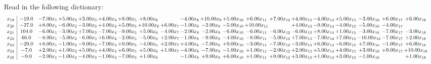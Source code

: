 \documentclass[9pt]{article}
\begin{document}
Read in the following dictionary:
\[\begin{array}{c| c c@{\hskip 2pt} c@{\hskip 2pt} c@{\hskip 2pt} c@{\hskip 2pt} c@{\hskip 2pt} c@{\hskip 2pt} c@{\hskip 2pt} c@{\hskip 2pt} c@{\hskip 2pt} c@{\hskip 2pt} c@{\hskip 2pt} c@{\hskip 2pt} c@{\hskip 2pt} c@{\hskip 2pt} c@{\hskip 2pt} c@{\hskip 2pt} c@{\hskip 2pt} c@{\hskip 2pt} }
 x_{19}   &  -19.0 & -7.00 x_{1} & +  5.00 x_{2} & +  3.00 x_{3} & +  4.00 x_{4} & +  8.00 x_{5} & +  8.00 x_{6} &   & -4.00 x_{8} & + 10.00 x_{9} & +  5.00 x_{10} & +  6.00 x_{11} & +  7.00 x_{12} & +  4.00 x_{13} & -4.00 x_{14} & +  5.00 x_{15} & -3.00 x_{16} & +  6.00 x_{17} & +  6.00 x_{18}\\
 x_{20}   &  -27.0 & +  8.00 x_{1} & -6.00 x_{2} & -3.00 x_{3} & +  4.00 x_{4} & +  5.00 x_{5} & + 10.00 x_{6} & +  6.00 x_{7} & -1.00 x_{8} & -2.00 x_{9} & -5.00 x_{10} & + 10.00 x_{11} &   & +  4.00 x_{13} & -9.00 x_{14} & -4.00 x_{15} & -5.00 x_{16} & -4.00 x_{17} &   \\
 x_{21}   &  104.0 & -6.00 x_{1} & -3.00 x_{2} & +  7.00 x_{3} & -7.00 x_{4} & -9.00 x_{5} & +  5.00 x_{6} & -4.00 x_{7} & -2.00 x_{8} & -2.00 x_{9} & -6.00 x_{10} & -6.00 x_{11} & -6.00 x_{12} & -6.00 x_{13} & +  8.00 x_{14} & +  1.00 x_{15} & -3.00 x_{16} & -7.00 x_{17} & -3.00 x_{18}\\
 x_{22}   &  66.0 & -8.00 x_{1} & -5.00 x_{2} & -6.00 x_{3} & +  6.00 x_{4} & -2.00 x_{5} & -5.00 x_{6} & +  2.00 x_{7} & -1.00 x_{8} & -9.00 x_{9} & -4.00 x_{10} & -8.00 x_{11} & -5.00 x_{12} & +  7.00 x_{13} & -7.00 x_{14} & +  7.00 x_{15} & -10.00 x_{16} & -7.00 x_{17} & +  2.00 x_{18}\\
 x_{23}   &  -29.0 & +  8.00 x_{1} & -1.00 x_{2} & -9.00 x_{3} & -7.00 x_{4} & +  9.00 x_{5} & -4.00 x_{6} & +  2.00 x_{7} & +  4.00 x_{8} & -7.00 x_{9} & +  9.00 x_{10} & -3.00 x_{11} & -7.00 x_{12} & -3.00 x_{13} & +  6.00 x_{14} & -6.00 x_{15} & +  7.00 x_{16} & -1.00 x_{17} & +  6.00 x_{18}\\
 x_{24}   &  -7.0 & +  2.00 x_{1} & +  1.00 x_{2} & +  5.00 x_{3} & +  4.00 x_{4} & +  6.00 x_{5} & +  5.00 x_{6} & +  1.00 x_{7} & -4.00 x_{8} & -7.00 x_{9} & -1.00 x_{10} & +  1.00 x_{11} & -2.00 x_{12} & +  2.00 x_{13} & +  5.00 x_{14} & +  4.00 x_{15} & +  3.00 x_{16} & +  9.00 x_{17} & + 10.00 x_{18}\\
 x_{25}   &  -9.0 & -2.00 x_{1} & -1.00 x_{2} & -4.00 x_{3} & -1.00 x_{4} & -7.00 x_{5} & +  1.00 x_{6} &   & -1.00 x_{8} & +  9.00 x_{9} & +  6.00 x_{10} & +  1.00 x_{11} & +  9.00 x_{12} & +  3.00 x_{13} & +  1.00 x_{14} & +  3.00 x_{15} & -1.00 x_{16} &   & +  1.00 x_{18}\\

\end{array}\]
\end{document}
